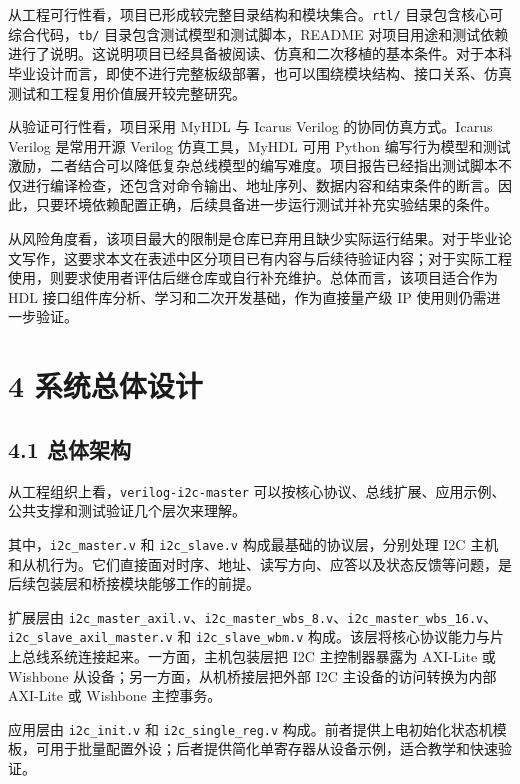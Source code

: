 从工程可行性看，项目已形成较完整目录结构和模块集合。\texttt{rtl/} 目录包含核心可综合代码，\texttt{tb/} 目录包含测试模型和测试脚本，README 对项目用途和测试依赖进行了说明。这说明项目已经具备被阅读、仿真和二次移植的基本条件。对于本科毕业设计而言，即使不进行完整板级部署，也可以围绕模块结构、接口关系、仿真测试和工程复用价值展开较完整研究。

从验证可行性看，项目采用 MyHDL 与 Icarus Verilog 的协同仿真方式。Icarus Verilog 是常用开源 Verilog 仿真工具，MyHDL 可用 Python 编写行为模型和测试激励，二者结合可以降低复杂总线模型的编写难度。项目报告已经指出测试脚本不仅进行编译检查，还包含对命令输出、地址序列、数据内容和结束条件的断言。因此，只要环境依赖配置正确，后续具备进一步运行测试并补充实验结果的条件。

从风险角度看，该项目最大的限制是仓库已弃用且缺少实际运行结果。对于毕业论文写作，这要求本文在表述中区分项目已有内容与后续待验证内容；对于实际工程使用，则要求使用者评估后继仓库或自行补充维护。总体而言，该项目适合作为 HDL 接口组件库分析、学习和二次开发基础，作为直接量产级 IP 使用则仍需进一步验证。

\section{4 系统总体设计}\label{ux7cfbux7edfux603bux4f53ux8bbeux8ba1}

\subsection{4.1 总体架构}\label{ux603bux4f53ux67b6ux6784}

从工程组织上看，\texttt{verilog-i2c-master} 可以按核心协议、总线扩展、应用示例、公共支撑和测试验证几个层次来理解。

其中，\texttt{i2c\_master.v} 和 \texttt{i2c\_slave.v} 构成最基础的协议层，分别处理 I2C 主机和从机行为。它们直接面对时序、地址、读写方向、应答以及状态反馈等问题，是后续包装层和桥接模块能够工作的前提。

扩展层由 \texttt{i2c\_master\_axil.v}、\texttt{i2c\_master\_wbs\_8.v}、\texttt{i2c\_master\_wbs\_16.v}、\texttt{i2c\_slave\_axil\_master.v} 和 \texttt{i2c\_slave\_wbm.v} 构成。该层将核心协议能力与片上总线系统连接起来。一方面，主机包装层把 I2C 主控制器暴露为 AXI-Lite 或 Wishbone 从设备；另一方面，从机桥接层把外部 I2C 主设备的访问转换为内部 AXI-Lite 或 Wishbone 主控事务。

应用层由 \texttt{i2c\_init.v} 和 \texttt{i2c\_single\_reg.v} 构成。前者提供上电初始化状态机模板，可用于批量配置外设；后者提供简化单寄存器从设备示例，适合教学和快速验证。

